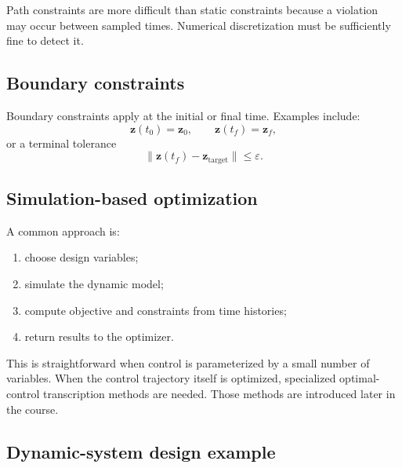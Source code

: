 \documentclass[11pt]{article}
\newcommand{\vect}[1]{\boldsymbol{#1}}
\newcommand{\statev}{\vect{z}}
\begin{document}
Path constraints are more difficult than static constraints because a violation may occur between sampled times. Numerical discretization must be sufficiently fine to detect it.

\subsection{Boundary constraints}

Boundary constraints apply at the initial or final time. Examples include:
\begin{equation}
\statev(t_0)=\statev_0, \qquad
\statev(t_f)=\statev_f,
\end{equation}
or a terminal tolerance
\begin{equation}
\|\statev(t_f)-\statev_{\mathrm{target}}\|\leq \varepsilon.
\end{equation}

\subsection{Simulation-based optimization}

A common approach is:
\begin{enumerate}[leftmargin=1.5em]
  \item choose design variables;
  \item simulate the dynamic model;
  \item compute objective and constraints from time histories;
  \item return results to the optimizer.
\end{enumerate}
This is straightforward when control is parameterized by a small number of variables. When the control trajectory itself is optimized, specialized optimal-control transcription methods are needed. Those methods are introduced later in the course.

\subsection{Dynamic-system design example}
\end{document}
